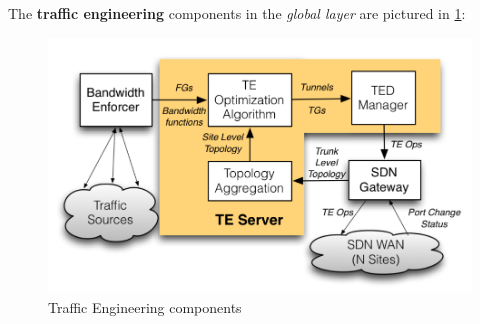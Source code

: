 \documentclass[10pt,a4paper]{report}
\theoremstyle{definition}
\begin{document}
The \textbf{traffic engineering} components in the \textit{global layer} are pictured in \ref{TE-arch}:
\begin{figure}[h]
	\centering\includegraphics[scale=0.40]{images/Pasted image 20230330110124.png}
	\caption{Traffic Engineering components}
\label{TE-arch}
\end{figure}
\end{document}

